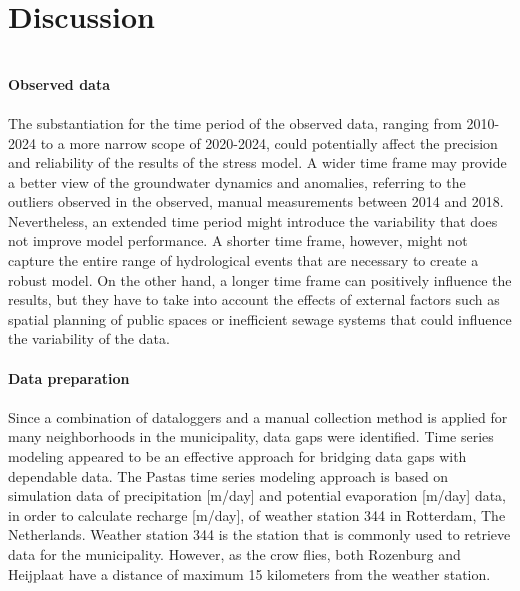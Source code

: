 \chapter{                                                                                                       Discussion}
\label{chapter:discussion}
\\
\textbf{Observed data}\\
\\
The substantiation for the time period of the observed data, ranging from 2010-2024 to a more narrow scope of 2020-2024, could potentially affect the precision and reliability of the results of the stress model. A wider time frame may provide a better view of the groundwater dynamics and anomalies, referring to the outliers observed in the observed, manual measurements between 2014 and 2018. Nevertheless, an extended time period might introduce the variability that does not improve model performance. A shorter time frame, however, might not capture the entire range of hydrological events that are necessary to create a robust model. On the other hand, a longer time frame can positively influence the results, but they have to take into account the effects of external factors such as spatial planning of public spaces or inefficient sewage systems that could influence the variability of the data.    \\
\\

\textbf{Data preparation}\\
\\
Since a combination of dataloggers and a manual collection method is applied for many neighborhoods in the municipality, data gaps were identified. Time series modeling appeared to be an effective approach for bridging data gaps with dependable data. The Pastas time series modeling approach is based on simulation data of precipitation [m/day] and potential evaporation [m/day] data, in order to calculate recharge [m/day], of weather station 344 in Rotterdam, The Netherlands. Weather station 344 is the station that is commonly used to retrieve data for the municipality. However, as the crow flies, both Rozenburg and Heijplaat have a distance of maximum 15 kilometers from the weather station.

